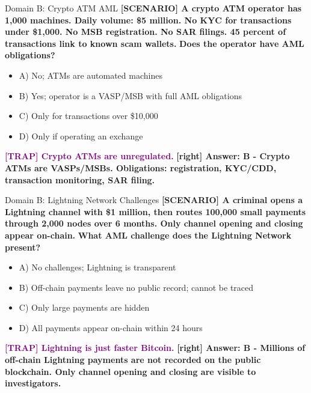 \documentclass[11pt,a4paper]{beamer}
\newcommand{\trap}[1]{\textcolor{purple}{\textbf{[TRAP] #1}}}
\newcommand{\correct}[1]{\textcolor{green!50!black}{\textbf{[right] #1}}}
\newcommand{\scenario}[1]{\textcolor{blue!70!black}{\textbf{[SCENARIO] #1}}}
\begin{document}
\begin{frame}{Domain B: Crypto ATM AML}
\scenario{A crypto ATM operator has 1,000 machines. Daily volume: \$5 million. No KYC for transactions under \$1,000. No MSB registration. No SAR filings. 45 percent of transactions link to known scam wallets.}
\vspace{0.2cm}
\textbf{Does the operator have AML obligations?}
\vspace{0.2cm}
\begin{itemize}
    \item A) No; ATMs are automated machines
    \item B) Yes; operator is a VASP/MSB with full AML obligations
    \item C) Only for transactions over \$10,000
    \item D) Only if operating an exchange
\end{itemize}
\vspace{0.2cm}
\trap{Crypto ATMs are unregulated.}
\correct{Answer: B - Crypto ATMs are VASPs/MSBs. Obligations: registration, KYC/CDD, transaction monitoring, SAR filing.}
\end{frame}

\begin{frame}{Domain B: Lightning Network Challenges}
\scenario{A criminal opens a Lightning channel with \$1 million, then routes 100,000 small payments through 2,000 nodes over 6 months. Only channel opening and closing appear on-chain.}
\vspace{0.2cm}
\textbf{What AML challenge does the Lightning Network present?}
\vspace{0.2cm}
\begin{itemize}
    \item A) No challenges; Lightning is transparent
    \item B) Off-chain payments leave no public record; cannot be traced
    \item C) Only large payments are hidden
    \item D) All payments appear on-chain within 24 hours
\end{itemize}
\vspace{0.2cm}
\trap{Lightning is just faster Bitcoin.}
\correct{Answer: B - Millions of off-chain Lightning payments are not recorded on the public blockchain. Only channel opening and closing are visible to investigators.}
\end{frame}
\end{document}
